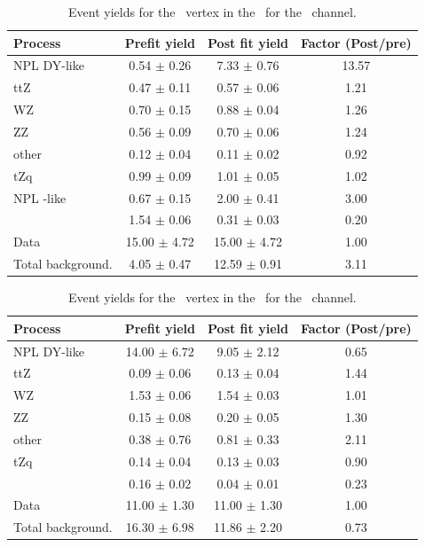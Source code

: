 \begin{table}[htbp]
	\centering
	\caption{Event yields for the \Zut\ vertex in the \STSR\  for the \eee\ channel. }
	\begin{tabular} {l c c c }
		\toprule
		Process & Prefit yield & Post fit yield & Factor (Post/pre) \\
		\midrule
		NPL DY-like & 0.54 $ \pm $ 0.26 & 7.33 $ \pm $ 0.76 & 13.57 \\ 
		ttZ & 0.47 $ \pm $ 0.11 & 0.57 $ \pm $ 0.06 & 1.21 \\ 
		WZ & 0.70 $ \pm $ 0.15 & 0.88 $ \pm $ 0.04 & 1.26 \\ 
		ZZ & 0.56 $ \pm $ 0.09 & 0.70 $ \pm $ 0.06 & 1.24 \\ 
		other & 0.12 $ \pm $ 0.04 & 0.11 $ \pm $ 0.02 & 0.92 \\ 
		tZq & 0.99 $ \pm $ 0.09 & 1.01 $ \pm $ 0.05 & 1.02 \\ 
		NPL \ttbar-like & 0.67 $ \pm $ 0.15 & 2.00 $ \pm $ 0.41 & 3.00\\
		\kZut  & 1.54 $ \pm $ 0.06 & 0.31 $ \pm $ 0.03 & 0.20\\
		\hdashline
		Data & 15.00 $ \pm $ 4.72 & 15.00 $ \pm $ 4.72 & 1.00\\
		Total background. & 4.05 $ \pm $ 0.47 & 12.59 $ \pm $ 0.91 & 3.11\\
		\bottomrule
	\end{tabular}
\end{table}
\begin{table}[htbp]
	\centering
	\caption{Event yields for the \Zut\ vertex in the \STCR\  for the \mumumu\ channel. }
	\begin{tabular} {l c c c }
		\toprule
		Process & Prefit yield & Post fit yield & Factor (Post/pre) \\
		\midrule
		NPL DY-like & 14.00 $ \pm $ 6.72 & 9.05 $ \pm $ 2.12 & 0.65 \\ 
		ttZ & 0.09 $ \pm $ 0.06 & 0.13 $ \pm $ 0.04 & 1.44 \\ 
		WZ & 1.53 $ \pm $ 0.06 & 1.54 $ \pm $ 0.03 & 1.01 \\ 
		ZZ & 0.15 $ \pm $ 0.08 & 0.20 $ \pm $ 0.05 & 1.30 \\ 
		other & 0.38 $ \pm $ 0.76 & 0.81 $ \pm $ 0.33 & 2.11 \\ 
		tZq & 0.14 $ \pm $ 0.04 & 0.13 $ \pm $ 0.03 & 0.90 \\ 
		\kZut  & 0.16 $ \pm $ 0.02 & 0.04 $ \pm $ 0.01 & 0.23\\
		\hdashline
		Data & 11.00 $ \pm $ 1.30 & 11.00 $ \pm $ 1.30 & 1.00\\
		Total background. & 16.30 $ \pm $ 6.98 & 11.86 $ \pm $ 2.20 & 0.73\\
		\bottomrule
	\end{tabular}
\end{table}
